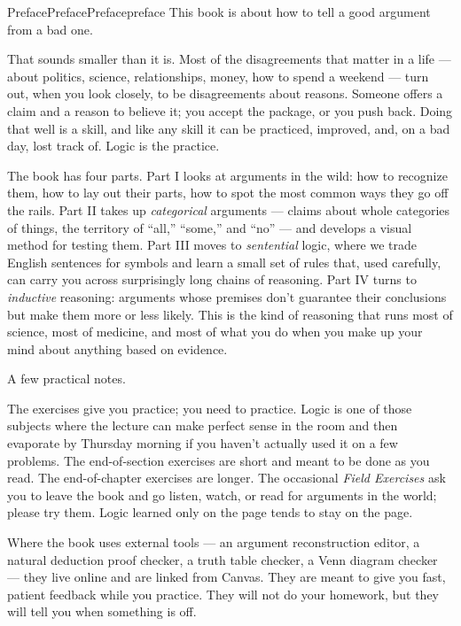 \documentclass[oneside,10pt,]{book}
\begin{document}
\begin{preface}{Preface}{Preface}{}{Preface}{}{}{preface}
This book is about how to tell a good argument from a bad one.%
\par
That sounds smaller than it is. Most of the disagreements that matter in a life — about politics, science, relationships, money, how to spend a weekend — turn out, when you look closely, to be disagreements about reasons. Someone offers a claim and a reason to believe it; you accept the package, or you push back. Doing that well is a skill, and like any skill it can be practiced, improved, and, on a bad day, lost track of. Logic is the practice.%
\par
The book has four parts. Part I looks at arguments in the wild: how to recognize them, how to lay out their parts, how to spot the most common ways they go off the rails. Part II takes up \emph{categorical} arguments — claims about whole categories of things, the territory of ``all,'' ``some,'' and ``no'' — and develops a visual method for testing them. Part III moves to \emph{sentential} logic, where we trade English sentences for symbols and learn a small set of rules that, used carefully, can carry you across surprisingly long chains of reasoning. Part IV turns to \emph{inductive} reasoning: arguments whose premises don't guarantee their conclusions but make them more or less likely. This is the kind of reasoning that runs most of science, most of medicine, and most of what you do when you make up your mind about anything based on evidence.%
\par
A few practical notes.%
\par
The exercises give you practice; you need to practice. Logic is one of those subjects where the lecture can make perfect sense in the room and then evaporate by Thursday morning if you haven't actually used it on a few problems. The end-of-section exercises are short and meant to be done as you read. The end-of-chapter exercises are longer. The occasional \emph{Field Exercises} ask you to leave the book and go listen, watch, or read for arguments in the world; please try them. Logic learned only on the page tends to stay on the page.%
\par
Where the book uses external tools — an argument reconstruction editor, a natural deduction proof checker, a truth table checker, a Venn diagram checker — they live online and are linked from Canvas. They are meant to give you fast, patient feedback while you practice. They will not do your homework, but they will tell you when something is off.%

\end{preface}
\end{document}
